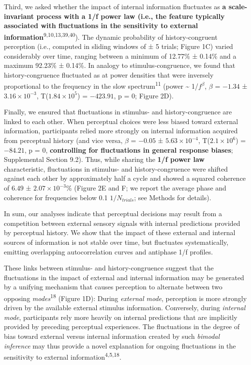 \documentclass[
]{article}
\begin{document}
Third, we asked whether the impact of internal information fluctuates as
\textbf{a scale-invariant process with a 1/f power law (i.e., the
feature typically associated with fluctuations in the sensitivity to
external information}\textsuperscript{9,10,13,39,40}). The dynamic
probability of history-congruent perception (i.e., computed in sliding
windows of ± 5 trials; Figure 1C) varied considerably over time, ranging
between a minimum of 12.77\% ± 0.14\% and a maximum 92.23\% ± 0.14\%. In
analogy to stimulus-congruence, we found that history-congruence
fluctuated as at power densities that were inversely proportional to the
frequency in the slow spectrum\textsuperscript{11} (power
\textasciitilde{} 1/\(f^\beta\), \(\beta\) = \(-1.34\) ±
\(\ensuremath{3.16\times 10^{-3}}\),
T(\(\ensuremath{1.84\times 10^{5}}\)) = \(-423.91\), p = \(0\); Figure
2D).

Finally, we ensured that fluctuations in stimulus- and
history-congruence are linked to each other. When perceptual choices
were less biased toward external information, participants relied more
strongly on internal information acquired from perceptual history (and
vice versa, \(\beta\) = \(-0.05\) ± \(\ensuremath{5.63\times 10^{-4}}\),
T(\(\ensuremath{2.1\times 10^{6}}\)) = \(-84.21\), p = \(0\),
\textbf{controlling for fluctuations in general response biases};
Supplemental Section 9.2). Thus, while sharing the \textbf{1/f power
law} characteristic, fluctuations in stimulus- and history-congruence
were shifted against each other by approximately half a cycle and showed
a squared coherence of \(6.49\) ± \(\ensuremath{2.07\times 10^{-3}}\)\%
(Figure 2E and F; we report the average phase and coherence for
frequencies below 0.1 \(1/N_{trials}\); see Methods for details).

In sum, our analyses indicate that perceptual decisions may result from
a competition between external sensory signals with internal predictions
provided by perceptual history. We show that the impact of these
external and internal sources of information is not stable over time,
but fluctuates systematically, emitting overlapping autocorrelation
curves and antiphase 1/f profiles.

These links between stimulus- and history-congruence suggest that the
fluctuations in the impact of external and internal information may be
generated by a unifying mechanism that causes perception to alternate
between two opposing \emph{modes}\textsuperscript{18} (Figure 1D):
During \emph{external mode}, perception is more strongly driven by the
available external stimulus information. Conversely, during
\emph{internal mode}, participants rely more heavily on internal
predictions that are implicitly provided by preceding perceptual
experiences. The fluctuations in the degree of bias toward external
versus internal information created by such \emph{bimodal inference} may
thus provide a novel explanation for ongoing fluctuations in the
sensitivity to external information\textsuperscript{4,5,18}.
\end{document}
